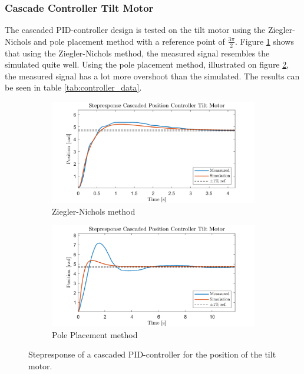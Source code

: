 \documentclass[../../main.tex]{subfiles}
\begin{document}
\subsubsection*{Cascade Controller Tilt Motor}
The cascaded PID-controller design is tested on the tilt motor using the Ziegler-Nichols and pole placement method with a reference point of $\frac{3\pi}{2}$. Figure \ref{fig:Cascade_ZN_tilt} shows that using the Ziegler-Nichols method, the measured signal resembles the simulated quite well. Using the pole placement method, illustrated on figure \ref{fig:cascade_model_tilt}, the measured signal has a lot more overshoot than the simulated. The results can be seen in table \ref{tab:controller_data}.

\begin{figure}[h]
     \centering
     \begin{subfigure}[b]{0.49\textwidth}
         \centering
         \includegraphics[width=\textwidth]{Sections/Test/Images/cascade_ZN_tilt.png}
         \caption{Ziegler-Nichols method}
         \label{fig:Cascade_ZN_tilt}
     \end{subfigure}
     \hfill
     \begin{subfigure}[b]{0.49\textwidth}
         \centering
         \includegraphics[width=\textwidth]{Sections/Test/Images/cascade_Model_tilt.png}
         \caption{Pole Placement method}
         \label{fig:cascade_model_tilt}
     \end{subfigure}
        \caption{Stepresponse of a cascaded PID-controller for the position of the tilt motor.}
        \label{fig:CascadeTilt}
\end{figure}
\end{document}
